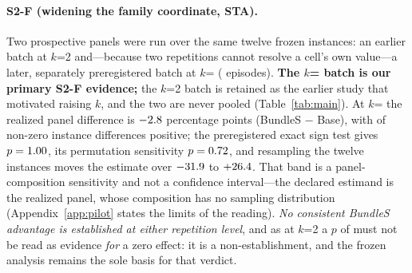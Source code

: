 \documentclass{article}
\begin{document}
\paragraph{S2-F (widening the family coordinate, STA).} Two prospective panels were run over the same twelve frozen instances: an earlier batch at $k$=2 and---because two repetitions cannot resolve a cell's own value---a later, separately preregistered batch at $k$=\StatEightAK{} (\StatEightAEpisodes{} episodes). \textbf{The $k$=\StatEightAK{} batch is our primary S2-F evidence;} the $k$=2 batch is retained as the earlier study that motivated raising $k$, and the two are never pooled (Table~\ref{tab:main}). At $k$=\StatEightAK{} the realized panel difference is $-2.8$ percentage points (BundleS $-$ Base), with \StatEightASignPositive{} of \StatEightASignNonzero{} non-zero instance differences positive; the preregistered exact sign test gives $p=1.00$, its permutation sensitivity $p=0.72$, and resampling the twelve instances moves the estimate over $-31.9$ to $+26.4$. That band is a panel-composition sensitivity and not a confidence interval---the declared estimand is the realized panel, whose composition has no sampling distribution (Appendix~\ref{app:pilot} states the limits of the reading). \emph{No consistent BundleS advantage is established at either repetition level}, and as at $k$=2 a $p$ of \StatEightASignP{} must not be read as evidence \emph{for} a zero effect: it is a non-establishment, and the frozen analysis remains the sole basis for that verdict.
\end{document}
